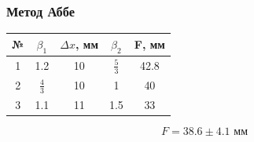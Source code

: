 \documentclass[10pt,pdf,hyperref={unicode}]{beamer}
\begin{document}
\begin{frame}
\frametitle{Метод Аббе} 


\begin{center}
	\begin{tabular}{|c|c|c|c|c|}
		\hline
		 № & $\beta_1$ & $\Delta x$, мм & $\beta_2$ & F, мм \\
		\hline
		1 & 1.2 & 10 & $\frac 5 3$ & 42.8 \\
		\hline
		2 & $\frac 4 3$ & 10 & 1 & 40\\
		\hline
		3 & 1.1 & 11 & 1.5 & 33 \\
		\hline
	\end{tabular}
\end{center}


\begin{equation*} %
	F = 38.6 \pm 4.1\text{ мм}
\end{equation*}
\end{frame}
\end{document}
